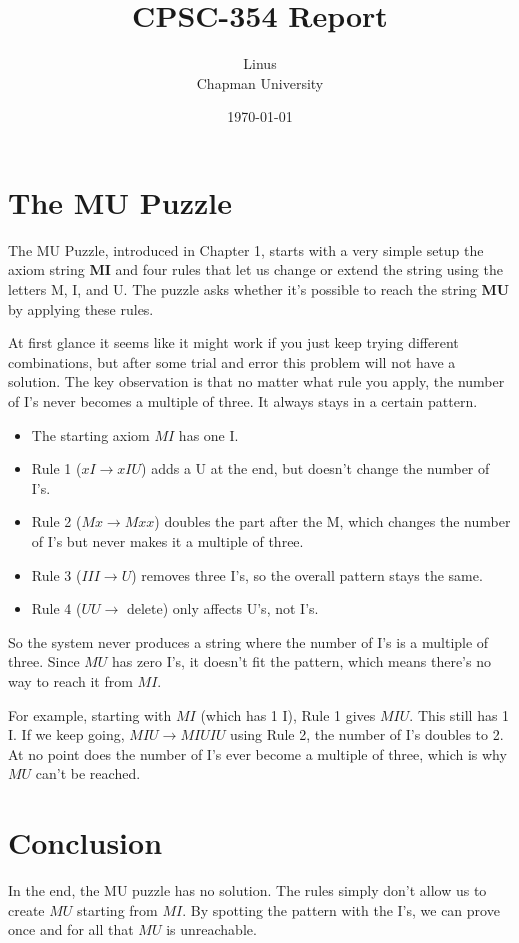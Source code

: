\documentclass{article}
\title{CPSC-354 Report}
\author{Linus \\ Chapman University}
\date{\today}
\theoremstyle{theorem}
\theoremstyle{definition}
\theoremstyle{remark}
\begin{document}
\maketitle



\setcounter{tocdepth}{3}

\section*{The MU Puzzle}

The MU Puzzle, introduced in Chapter 1, starts with a very simple setup the axiom string \textbf{MI} and four rules that let us change or extend the string using the letters M, I, and U. The puzzle asks whether it’s possible to reach the string \textbf{MU} by applying these rules.

At first glance it seems like it might work if you just keep trying different combinations, but after some trial and error this problem will not have a solution. The key observation is that no matter what rule you apply, the number of I’s never becomes a multiple of three. It always stays in a certain pattern.

\begin{itemize}
  \item The starting axiom $MI$ has one I.
  \item Rule 1 ($xI \to xIU$) adds a U at the end, but doesn’t change the number of I’s.
  \item Rule 2 ($Mx \to Mxx$) doubles the part after the M, which changes the number of I’s but never makes it a multiple of three.
  \item Rule 3 ($III \to U$) removes three I’s, so the overall pattern stays the same.
  \item Rule 4 ($UU \to$ delete) only affects U’s, not I’s.
\end{itemize}


So the system never produces a string where the number of I’s is a multiple of three. Since $MU$ has zero I’s, it doesn’t fit the pattern, which means there’s no way to reach it from $MI$.

\par
For example, starting with $MI$ (which has 1 I), Rule 1 gives $MIU$. This still has 1 I. If we keep going, $MIU \to MIUIU$ using Rule 2, the number of I’s doubles to 2. At no point does the number of I’s ever become a multiple of three, which is why $MU$ can’t be reached.

\section*{Conclusion}
In the end, the MU puzzle has no solution. The rules simply don’t allow us to create $MU$ starting from $MI$. By spotting the pattern with the I’s, we can prove once and for all that $MU$ is unreachable.
\end{document}

